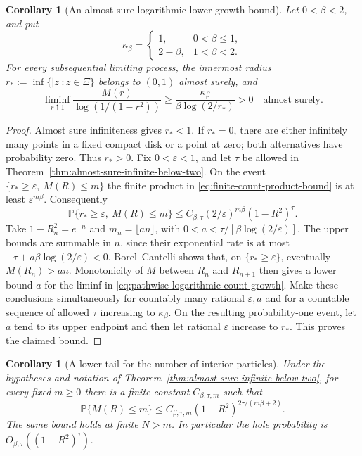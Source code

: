 \documentclass[11pt,a4paper]{article}
\numberwithin{equation}{section}
\newtheorem{corollary}[theorem]{Corollary}
\theoremstyle{definition}
\theoremstyle{remark}
\begin{document}
\begin{corollary}[An almost sure logarithmic lower growth bound]
\label{cor:pathwise-logarithmic-count-growth}
Let $0<\beta<2$, and put
\[
 \kappa_\beta=\begin{cases}
 1,&0<\beta\le1,\\
 2-\beta,&1<\beta<2.
 \end{cases}
\]
For every subsequential limiting process, the innermost radius
$r_*:=\inf\{|z|:z\in\Xi\}$ belongs to $(0,1)$ almost surely,
and
\begin{equation}
 \liminf_{r\uparrow1}
 \frac{M(r)}{\log(1/(1-r^2))}
 \ge\frac{\kappa_\beta}{\beta\log(2/r_*)}>0
 \quad\text{almost surely}.
 \label{eq:pathwise-logarithmic-count-growth}
\end{equation}
\end{corollary}

\begin{proof}
Almost sure infiniteness gives $r_*<1$. If $r_*=0$, there are
either infinitely many points in a fixed compact disk or a point
at zero; both alternatives have probability zero. Thus $r_*>0$.
Fix $0<\varepsilon<1$, and let $\tau$ be allowed in
Theorem~\ref{thm:almost-sure-infinite-below-two}. On the event
$\{r_*\ge\varepsilon,\ M(R)\le m\}$ the finite product in
\eqref{eq:finite-count-product-bound} is at least
$\varepsilon^{m\beta}$. Consequently
\[
 \mathbb P\{r_*\ge\varepsilon,\ M(R)\le m\}
 \le C_{\beta,\tau}(2/\varepsilon)^{m\beta}(1-R^2)^\tau.
\]
Take $1-R_n^2=e^{-n}$ and $m_n=\lfloor an\rfloor$, with
$0<a<\tau/[\beta\log(2/\varepsilon)]$. The upper bounds are
summable in $n$, since their exponential rate is at most
$-\tau+a\beta\log(2/\varepsilon)<0$. Borel--Cantelli shows
that, on $\{r_*\ge\varepsilon\}$, eventually $M(R_n)>an$.
Monotonicity of $M$ between $R_n$ and $R_{n+1}$ then gives a
lower bound $a$ for the liminf in
\eqref{eq:pathwise-logarithmic-count-growth}. Make these
conclusions simultaneously for countably many rational
$\varepsilon,a$ and for a countable sequence of allowed $\tau$
increasing to $\kappa_\beta$. On the resulting probability-one
event, let $a$ tend to its upper endpoint and then let rational
$\varepsilon$ increase to $r_*$. This proves the claimed bound.
\end{proof}

\begin{corollary}[A lower tail for the number of interior particles]
\label{cor:lower-count-tail-below-two}
Under the hypotheses and notation of
Theorem~\ref{thm:almost-sure-infinite-below-two}, for every fixed
$m\ge0$ there is a finite constant $C_{\beta,\tau,m}$ such that
\begin{equation}
 \mathbb P\{M(R)\le m\}
 \le C_{\beta,\tau,m}
                 (1-R^2)^{2\tau/(m\beta+2)}.
 \label{eq:lower-count-tail-below-two}
\end{equation}
The same bound holds at finite $N>m$. In particular the hole
probability is $O_{\beta,\tau}((1-R^2)^\tau)$.
\end{corollary}
\end{document}
